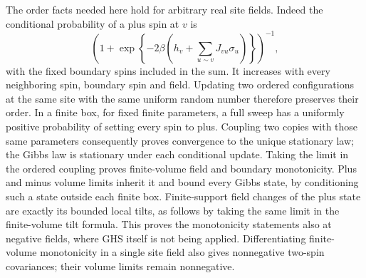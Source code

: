 \documentclass[11pt]{article}
\numberwithin{equation}{section}
\theoremstyle{definition}
\begin{document}
The order facts needed here hold for arbitrary real site fields.
Indeed the conditional probability of a plus spin at $v$ is
\[
 \left(1+\exp\left\{-2\beta
       \left(h_v+\sum_{u\sim v}J_{vu}\sigma_u\right)\right\}\right)^{-1},
\]
with the fixed boundary spins included in the sum.  It increases with
every neighboring spin, boundary spin and field.  Updating two ordered
configurations at the same site with the same uniform random number
therefore preserves their order.  In a finite box, for fixed finite
parameters, a full sweep has a uniformly positive probability of
setting every spin to plus.  Coupling two copies with those same
parameters consequently proves convergence to the unique stationary
law; the Gibbs law is stationary under each conditional update.
Taking the limit in the ordered coupling proves finite-volume field
and boundary monotonicity.  Plus and minus volume limits inherit it
and bound every Gibbs state, by conditioning such a state outside each
finite box.  Finite-support field changes of the plus state are exactly
its bounded local tilts, as follows by taking the same limit in the
finite-volume tilt formula.  This proves the monotonicity statements
also at negative fields, where GHS itself is not being applied.
Differentiating finite-volume monotonicity in a single site field
also gives nonnegative two-spin covariances; their volume limits
remain nonnegative.
\end{document}
